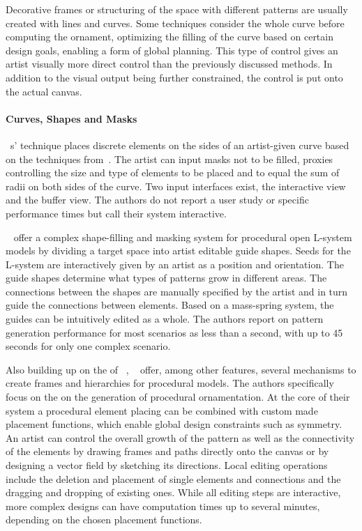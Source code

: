 Decorative frames or structuring of the space with different patterns are usually created with lines and curves. Some techniques consider the whole curve before computing the ornament, optimizing the filling of the curve based on certain design goals, enabling a form of global planning. This type of control gives an artist visually more direct control than the previously discussed methods. In addition to the visual output being further constrained, the control is put onto the actual canvas. 

\paragraph*{Curves, Shapes and Masks} \citeauthor*{anderson_2008_udt}~\cite{anderson_2008_udt}s' technique places discrete elements on the sides of an artist-given curve based on the techniques from~\cite{wong_1998_cgf}. The artist can input masks not to be filled, proxies controlling the size and type of elements to be placed and to equal the sum of radii on both sides of the curve. Two input interfaces exist, the interactive view and the buffer view. The authors do not report a user study or specific performance times but call their system interactive.  

\citeauthor*{benes_2011_gpm}~\cite{benes_2011_gpm} offer a complex shape-filling and masking system for procedural open L-system models by dividing a target space into artist editable guide shapes. Seeds for the L-system are interactively given by an artist as a position and orientation. The guide shapes determine what types of patterns grow in different areas. The connections between the shapes are manually specified by the artist and in turn guide the connections between elements. Based on a mass-spring system, the guides can be intuitively edited as a whole. The authors report on pattern generation performance for most scenarios as less than a second, with up to 45 seconds for only one complex scenario.

Also building up on the of \citeauthor*{wong_1998_cgf}~\cite{wong_1998_cgf}, \citeauthor*{gieseke_2017_ooo}~\cite{gieseke_2017_ooo} offer, among other features, several mechanisms to create frames and hierarchies for procedural models. The authors specifically focus on the on the generation of procedural ornamentation. At the core of their system a procedural element placing can be combined with custom made placement functions, which enable global design constraints such as symmetry. An artist can control the overall growth of the pattern as well as the connectivity of the elements by drawing frames and paths directly onto the canvas or by designing a vector field by sketching its directions. Local editing operations include the deletion and placement of single elements and connections and the dragging and dropping of existing ones. While all editing steps are interactive, more complex designs can have computation times up to several minutes, depending on the chosen placement functions.

